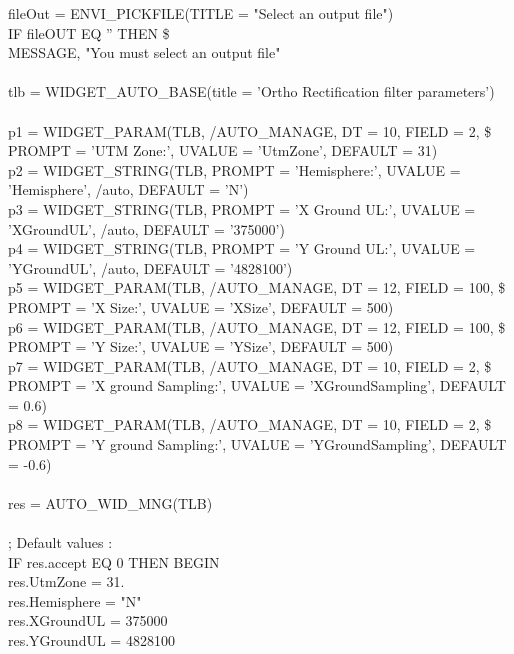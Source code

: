 \begin{scriptsize}
\indent fileOut = ENVI\_PICKFILE(TITLE = "Select an output file")\\
\indent IF fileOUT EQ '' THEN \$\\
\indent MESSAGE, "You must select an output file"\\
\\
\indent tlb = WIDGET\_AUTO\_BASE(title = 'Ortho Rectification filter parameters')\\
\\
\indent p1 = WIDGET\_PARAM(TLB, /AUTO\_MANAGE, DT = 10, FIELD = 2, \$\\
\indent PROMPT = 'UTM Zone:', UVALUE = 'UtmZone', DEFAULT = 31)\\
\indent p2 = WIDGET\_STRING(TLB, PROMPT = 'Hemisphere:', UVALUE = 'Hemisphere', /auto, DEFAULT = 'N')\\
\indent p3 = WIDGET\_STRING(TLB, PROMPT = 'X Ground UL:', UVALUE = 'XGroundUL', /auto, DEFAULT = '375000')\\
\indent p4 = WIDGET\_STRING(TLB, PROMPT = 'Y Ground UL:', UVALUE = 'YGroundUL', /auto, DEFAULT = '4828100')\\
\indent p5 = WIDGET\_PARAM(TLB, /AUTO\_MANAGE, DT = 12, FIELD = 100, \$\\
\indent PROMPT = 'X Size:', UVALUE = 'XSize', DEFAULT = 500)\\
\indent p6 = WIDGET\_PARAM(TLB, /AUTO\_MANAGE, DT = 12, FIELD = 100, \$\\
\indent PROMPT = 'Y Size:', UVALUE = 'YSize', DEFAULT = 500)\\
\indent p7 = WIDGET\_PARAM(TLB, /AUTO\_MANAGE, DT = 10, FIELD = 2, \$\\
\indent PROMPT = 'X ground Sampling:', UVALUE = 'XGroundSampling', DEFAULT = 0.6)\\
\indent p8 = WIDGET\_PARAM(TLB, /AUTO\_MANAGE, DT = 10, FIELD = 2, \$\\
\indent PROMPT = 'Y ground Sampling:', UVALUE = 'YGroundSampling', DEFAULT = -0.6)\\
\\
\indent res = AUTO\_WID\_MNG(TLB)\\
\\
\indent ; Default values :\\
\indent IF res.accept EQ 0 THEN BEGIN\\
\indent res.UtmZone = 31.\\
\indent res.Hemisphere = "N"\\
\indent res.XGroundUL = 375000\\
\indent res.YGroundUL = 4828100\\

\end{scriptsize}
